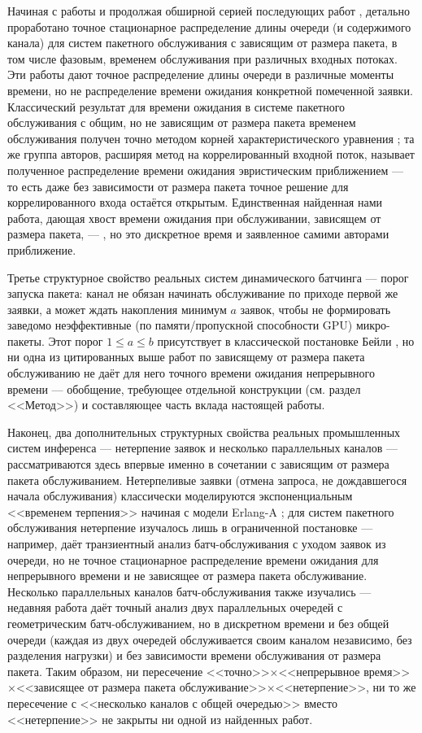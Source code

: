 \documentclass[12pt,a4paper]{article}
\begin{document}
Начиная с работы \cite{banerjee2012} и продолжая обширной серией последующих работ \cite{pradhan2016,banerjee2015,gupta2018,pradhan2024}, детально проработано точное стационарное распределение длины очереди (и содержимого канала) для систем пакетного обслуживания с зависящим от размера пакета, в том числе фазовым, временем обслуживания при различных входных потоках. Эти работы дают точное распределение длины очереди в различные моменты времени, но не распределение времени ожидания конкретной помеченной заявки. Классический результат для времени ожидания в системе пакетного обслуживания с общим, но не зависящим от размера пакета временем обслуживания получен точно методом корней характеристического уравнения \cite{chaudhry2023}; та же группа авторов, расширяя метод на коррелированный входной поток, называет полученное распределение времени ожидания эвристическим приближением \cite{banik2025} --- то есть даже без зависимости от размера пакета точное решение для коррелированного входа остаётся открытым. Единственная найденная нами работа, дающая хвост времени ожидания при обслуживании, зависящем от размера пакета, --- \cite{claeys2013}, но это дискретное время и заявленное самими авторами приближение.

Третье структурное свойство реальных систем динамического батчинга --- порог запуска пакета: канал не обязан начинать обслуживание по приходе первой же заявки, а может ждать накопления минимум $a$ заявок, чтобы не формировать заведомо неэффективные (по памяти/пропускной способности GPU) микро-пакеты. Этот порог $1\le a\le b$ присутствует в классической постановке Бейли \cite{bailey1954}, но ни одна из цитированных выше работ по зависящему от размера пакета обслуживанию не даёт для него точного времени ожидания непрерывного времени --- обобщение, требующее отдельной конструкции (см. раздел <<Метод>>) и составляющее часть вклада настоящей работы.

Наконец, два дополнительных структурных свойства реальных промышленных систем инференса --- нетерпение заявок и несколько параллельных каналов --- рассматриваются здесь впервые именно в сочетании с зависящим от размера пакета обслуживанием. Нетерпеливые заявки (отмена запроса, не дождавшегося начала обслуживания) классически моделируются экспоненциальным <<временем терпения>> начиная с модели Erlang-A \cite{garnett2002}; для систем пакетного обслуживания нетерпение изучалось лишь в ограниченной постановке --- например, \cite{vijayalaxmi2020} даёт транзиентный анализ батч-обслуживания с уходом заявок из очереди, но не точное стационарное распределение времени ожидания для непрерывного времени и не зависящее от размера пакета обслуживание. Несколько параллельных каналов батч-обслуживания также изучались --- недавняя работа \cite{bruneel2026} даёт точный анализ двух параллельных очередей с геометрическим батч-обслуживанием, но в дискретном времени и без общей очереди (каждая из двух очередей обслуживается своим каналом независимо, без разделения нагрузки) и без зависимости времени обслуживания от размера пакета. Таким образом, ни пересечение <<точно>>$\times$<<непрерывное время>>$\times$<<зависящее от размера пакета обслуживание>>$\times$<<нетерпение>>, ни то же пересечение с <<несколько каналов с общей очередью>> вместо <<нетерпение>> не закрыты ни одной из найденных работ.
\end{document}
